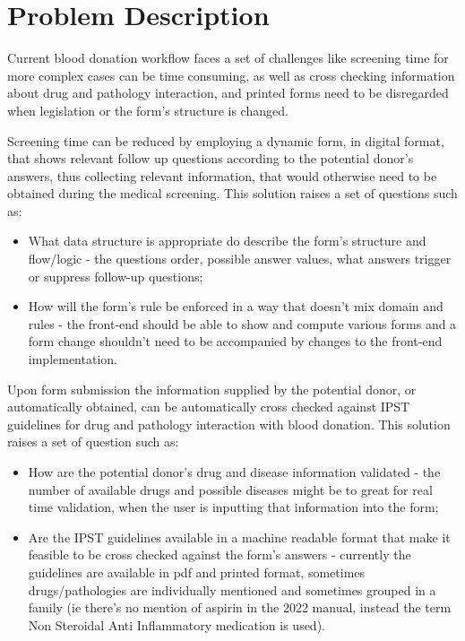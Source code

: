%
%
\chapter{Problem Description} \label{cap:enquadramento}

Current blood donation workflow faces a set of challenges like screening time for more complex cases can be time consuming, as well as cross checking information about drug and pathology interaction, and printed forms need to be disregarded when legislation or the form's structure is changed.

Screening time can be reduced by employing a dynamic form, in digital format, that shows relevant follow up questions according to the potential donor's answers, thus collecting relevant information, that would otherwise need to be obtained during the medical screening.
This solution raises a set of questions such as:
\begin{itemize}
	\item What data structure is appropriate do describe the form's structure and flow/logic - 
	the questions order, possible answer values, what answers trigger or suppress follow-up questions;
	\item How will the form's rule be enforced in a way that doesn't mix domain and rules - the front-end should be able to show and compute various forms and a form change shouldn't need to be accompanied by changes to the front-end implementation.
\end{itemize}

Upon form submission the information supplied by the potential donor, or automatically obtained, can be automatically cross checked against IPST guidelines for drug and pathology interaction with blood donation.
This solution raises a set of question such as:
\begin{itemize}
	\item How are the potential donor's drug and disease information validated - the number of available drugs and possible diseases might be to great for real time validation, when the user is inputting that information into the form;
	\item Are the IPST guidelines available in a machine readable format that make it feasible to be cross checked against the form's answers - currently the guidelines are available in pdf and printed format, sometimes drugs/pathologies are individually mentioned and sometimes grouped in a family (ie there's no mention of aspirin in the 2022 manual, instead the term Non Steroidal Anti Inflammatory medication is used).
\end{itemize}

